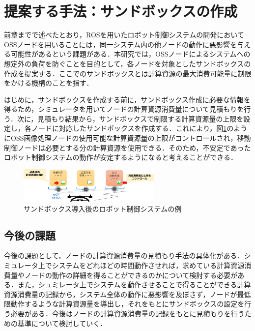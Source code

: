 \documentclass[11pt]{ujarticle} %
\begin{document}
\section{提案する手法：サンドボックスの作成}
前章までで述べたとおり，ROSを用いたロボット制御システムの開発においてOSSノードを用いることには，同一システム内の他ノードの動作に悪影響を与える可能性があるという課題がある．本研究では，OSSノードによるシステムへの想定外の負荷を防ぐことを目的として，各ノードを対象としたサンドボックスの作成を提案する．ここでのサンドボックスとは計算資源の最大消費可能量に制限をかける機構のことを指す．

はじめに，サンドボックスを作成する前に，サンドボックス作成に必要な情報を得るため，シミュレータを用いてノードの計算資源消費量について見積もりを行う．次に，見積もり結果から，サンドボックスで制限する計算資源量の上限を設定し，各ノードに対応したサンドボックスを作成する．これにより，図\ref{fig:after}のようにOSS画像処理ノードの使用可能な計算資源量の上限がコントロールされ，移動制御ノードは必要とする分の計算資源を使用できる．そのため，不安定であったロボット制御システムの動作が安定するようになると考えることができる．

\begin{figure}[t]
   \centering
   \includegraphics[width=7cm]{img/after.pdf}
   \caption{サンドボックス導入後のロボット制御システムの例}
   \label{fig:after}
\end{figure}

\subsection{今後の課題}
今後の課題として，ノードの計算資源消費量の見積もり手法の具体化がある．シミュレータ上でシステムをどれほどの時間動作させれば，求めている計算資源消費量やノードの動作の詳細を得ることができるのかについて検討する必要がある．また，シュミレータ上でシステムを動作させることで得ることができる計算資源消費量の記録から，システム全体の動作に悪影響を及ぼさず，ノードが最低限動作するような計算資源量を導出し，それをもとにサンドボックスの設定を行う必要がある．今後はノードの計算資源消費量の記録をもとに見積もりを行うための基準について検討していく．
\end{document}
